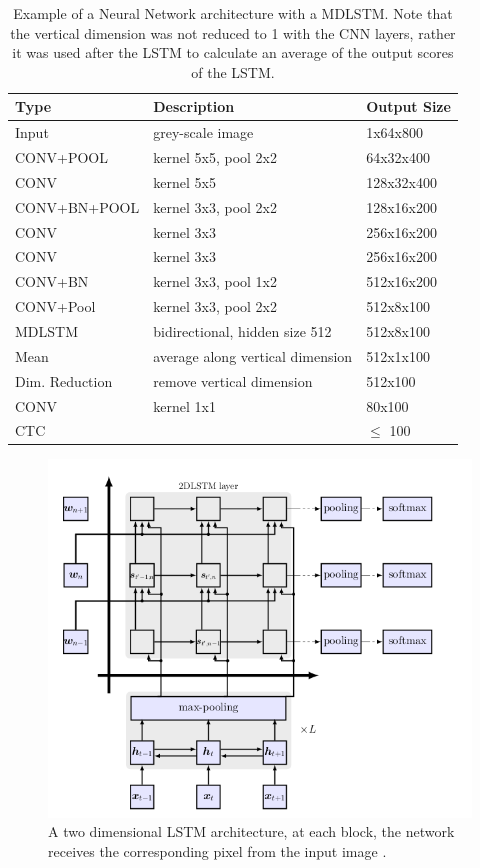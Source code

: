 \documentclass{article}
\begin{document}
\begin{table}[H]
\centering
\begin{tabular}{l|l|l}
Type & Description & Output Size \\ \hline
Input & grey-scale image & 1x64x800 \\ \hline
CONV+POOL & kernel 5x5, pool 2x2 & 64x32x400 \\ \hline
CONV & kernel 5x5 & 128x32x400 \\ \hline
CONV+BN+POOL & kernel 3x3, pool 2x2 & 128x16x200 \\ \hline
CONV & kernel 3x3 & 256x16x200 \\ \hline
CONV & kernel 3x3 & 256x16x200 \\ \hline
CONV+BN & kernel 3x3, pool 1x2 & 512x16x200 \\ \hline
CONV+Pool & kernel 3x3, pool 2x2 & 512x8x100 \\ \hline
MDLSTM         & bidirectional, hidden size 512 & 512x8x100 \\ \hline
Mean & average along vertical dimension & 512x1x100 \\ \hline
Dim. Reduction & remove vertical dimension & 512x100 \\ \hline
CONV         & kernel 1x1 & 80x100 \\ \hline
CTC          &      & \(\leqslant\) 100 \\ \hline
\end{tabular}
\caption{Example of a Neural Network architecture with a MDLSTM. Note that the vertical dimension was not reduced to 1 with the CNN layers, rather it was used after the LSTM to calculate an average of the output scores of the LSTM.}
\label{tab:MDLSTM}
\end{table}

\begin{figure}[H]
\begin{center}
\includegraphics[scale=0.35]{2D_LSTM}
\end{center}
\caption{A two dimensional LSTM architecture, at each block, the network receives the corresponding pixel from the input image \cite{Bahar}.}
\label{fig:2DLSTM}
\end{figure}
\end{document}
